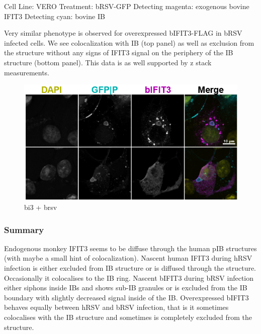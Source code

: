 Cell Line: VERO \newline
Treatment: bRSV-GFP \newline
Detecting magenta: exogenous bovine IFIT3 \newline
Detecting cyan: bovine IB \newline

Very similar phenotype is observed for overexpressed bIFIT3-FLAG in bRSV infected cells. We see colocalization with IB (top panel) as well as exclusion from the structure without any signs of IFIT3 signal on the periphery of the IB structure (bottom panel). This data is as well supported by z stack measurements.

\begin{figure}
    \centering
    \includegraphics[width=1\linewidth]{08. Chapter 3/Figs/04. IFIT3/06. bi3 brsv.png}
    \caption[bi3 + brsv]{bi3 + brsv}
    \label{bi3 + brsv}
\end{figure}

\subsubsection{Summary} \label{Summary}
Endogenous monkey IFIT3 seems to be diffuse through the human pIB structures (with maybe a small hint of colocalization). Nascent human IFIT3 during hRSV infection is either excluded from IB structure or is diffused through the structure. Occasionally it colocalises to the IB ring. Nascent bIFIT3 during bRSV infection either siphons inside IBs and shows sub-IB granules or is excluded from the IB boundary with slightly decreased signal inside of the IB. Overexpressed bIFIT3 behaves equally between hRSV and bRSV infection, that is it sometimes colocalises with the IB structure and sometimes is completely excluded from the structure.